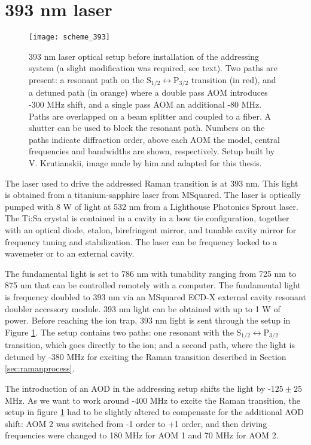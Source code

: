\section{393 nm laser}
\label{sec:393setup}
\begin{figure}[!ht]
\centering
\texttt{[image: scheme\_393]}
\caption{393 nm laser optical setup before installation of the addressing system (a slight modification was required, see text). Two paths are present: a resonant path on the $\text{S}_{1/2} \leftrightarrow \text{P}_{3/2}$ transition (in red), and a detuned path (in orange) where a double pass AOM introduces -300 MHz shift, and a single pass AOM an additional -80 MHz. Paths are overlapped on a beam splitter and coupled to a fiber. A shutter can be used to block the resonant path. Numbers on the paths indicate diffraction order, above each AOM the model, central frequencies and bandwidths are shown, respectively. Setup built by V. Krutianskii, image made by him and adapted for this thesis.
}
\label{scheme393}
\end{figure}
The laser used to drive the addressed Raman transition is at 393 nm. This light is obtained from a titanium-sapphire laser from MSquared. The laser is optically pumped with 8 W of light at 532 nm from a Lighthouse Photonics Sprout laser. The Ti:Sa crystal is contained in a cavity in a bow tie configuration, together with an optical diode, etalon, birefringent mirror, and tunable cavity mirror for frequency tuning and stabilization. The laser can be frequency locked to a wavemeter or to an external cavity.\par
The fundamental light is set to 786 nm with tunability ranging from 725 nm to 875 nm that can be controlled remotely with a computer. The fundamental light is frequency doubled to 393 nm via an MSquared ECD-X external cavity resonant doubler accessory module. 393 nm light can be obtained with up to 1 W of power. Before reaching the ion trap, 393 nm light is sent through the setup in Figure \ref{scheme393}. The setup contains two paths: one resonant with the $\text{S}_{1/2} \leftrightarrow \text{P}_{3/2}$ transition, which goes directly to the ion; and a second path, where the light is detuned by -380 MHz for exciting the Raman transition described in Section \ref{sec:ramanprocess}.\par
The introduction of an AOD in the addressing setup shifts the light by -$125\pm25$ MHz. As we want to work around -400 MHz to excite the Raman transition, the setup in figure \ref{scheme393} had to be slightly altered to compensate for the additional AOD shift: AOM 2 was switched from -1 order to +1 order, and then driving frequencies were changed to 180 MHz for AOM 1 and 70 MHz for AOM 2.

